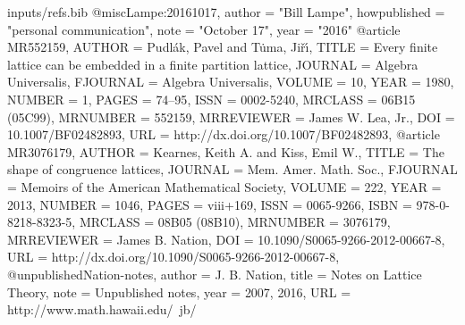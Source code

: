 \begin{filecontents*}{inputs/refs.bib}
@misc{Lampe:20161017,
  author        = "Bill Lampe",
  howpublished  = "personal communication",
  note          = "October 17",
  year          = "2016"
}
@article {MR552159,
    AUTHOR = {Pudl{\'a}k, Pavel and T{\.u}ma, Ji{\v{r}}{\'{\i}}},
     TITLE = {Every finite lattice can be embedded in a finite partition
              lattice},
   JOURNAL = {Algebra Universalis},
  FJOURNAL = {Algebra Universalis},
    VOLUME = {10},
      YEAR = {1980},
    NUMBER = {1},
     PAGES = {74--95},
      ISSN = {0002-5240},
   MRCLASS = {06B15 (05C99)},
  MRNUMBER = {552159},
MRREVIEWER = {James W. Lea, Jr.},
       DOI = {10.1007/BF02482893},
       URL = {http://dx.doi.org/10.1007/BF02482893},
}
@article {MR3076179,
    AUTHOR = {Kearnes, Keith A. and Kiss, Emil W.},
     TITLE = {The shape of congruence lattices},
   JOURNAL = {Mem. Amer. Math. Soc.},
  FJOURNAL = {Memoirs of the American Mathematical Society},
    VOLUME = {222},
      YEAR = {2013},
    NUMBER = {1046},
     PAGES = {viii+169},
      ISSN = {0065-9266},
      ISBN = {978-0-8218-8323-5},
   MRCLASS = {08B05 (08B10)},
  MRNUMBER = {3076179},
MRREVIEWER = {James B. Nation},
       DOI = {10.1090/S0065-9266-2012-00667-8},
       URL = {http://dx.doi.org/10.1090/S0065-9266-2012-00667-8},
}
@unpublished{Nation-notes,
author = {J. B. Nation},
title = {Notes on Lattice Theory},
note = {Unpublished notes},
year = {2007, 2016},
URL = {http://www.math.hawaii.edu/~jb/}
}
\end{filecontents*}
\documentclass[12pt]{amsart}

